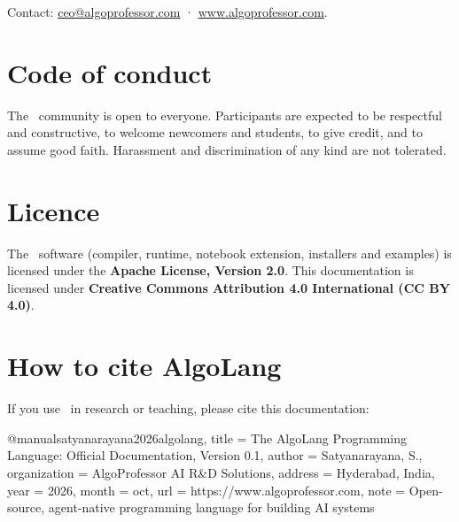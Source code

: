 Contact: \href{mailto:ceo@algoprofessor.com}{ceo@algoprofessor.com} · \href{https://www.algoprofessor.com}{www.algoprofessor.com}.

\section{Code of conduct}

The \algolang\ community is open to everyone. Participants are expected to be respectful and constructive, to welcome newcomers and students, to give credit, and to assume good faith. Harassment and discrimination of any kind are not tolerated.

\section{Licence}

The \algolang\ software (compiler, runtime, notebook extension, installers and examples) is licensed under the \textbf{Apache License, Version 2.0}. This documentation is licensed under \textbf{Creative Commons Attribution 4.0 International (CC BY 4.0)}.

\section{How to cite AlgoLang}
\label{sec:cite}

If you use \algolang\ in research or teaching, please cite this documentation:

\begin{plaincode}[title=BibTeX,unbreakable]
@manual{satyanarayana2026algolang,
  title        = {The {AlgoLang} Programming Language: Official Documentation, Version 0.1},
  author       = {Satyanarayana, S.},
  organization = {AlgoProfessor AI R\&D Solutions},
  address      = {Hyderabad, India},
  year         = {2026},
  month        = oct,
  url          = {https://www.algoprofessor.com},
  note         = {Open-source, agent-native programming language for building AI systems}
}
\end{plaincode}
